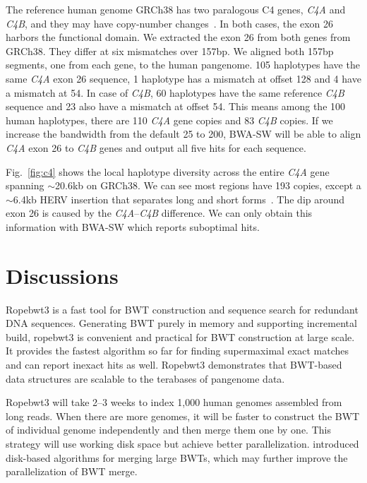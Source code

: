\documentclass[webpdf,contemporary,large,namedate]{oup-authoring-template}%
\begin{document}
The reference human genome GRCh38 has two paralogous C4 genes, \emph{C4A} and \emph{C4B}, and they may have copy-number changes~\citep{Sekar:2016aa}.
In both cases, the exon 26 harbors the functional domain.
We extracted the exon 26 from both genes from GRCh38.
They differ at six mismatches over 157bp.
We aligned both 157bp segments, one from each gene, to the human pangenome.
105 haplotypes have the same \emph{C4A} exon 26 sequence, 1 haplotype has a mismatch at offset 128 and 4 have a mismatch at 54.
In case of \emph{C4B}, 60 haplotypes have the same reference \emph{C4B} sequence and 23 also have a mismatch at offset 54.
This means among the 100 human haplotypes, there are 110 \emph{C4A} gene copies and 83 \emph{C4B} copies.
If we increase the bandwidth from the default 25 to 200, BWA-SW will be able to align \emph{C4A} exon 26 to \emph{C4B} genes
and output all five hits for each sequence.

Fig.~\ref{fig:c4} shows the local haplotype diversity across the entire \emph{C4A} gene spanning $\sim$20.6kb on GRCh38.
We can see most regions have 193 copies, except a $\sim$6.4kb HERV insertion that separates long and short forms~\citep{Sekar:2016aa}.
The dip around exon 26 is caused by the \emph{C4A}--\emph{C4B} difference.
We can only obtain this information with BWA-SW which reports suboptimal hits.

\section{Discussions}

Ropebwt3 is a fast tool for BWT construction and sequence search for redundant DNA sequences.
Generating BWT purely in memory and supporting incremental build, ropebwt3 is convenient and practical for BWT construction at large scale.
It provides the fastest algorithm so far for finding supermaximal exact matches and can report inexact hits as well.
Ropebwt3 demonstrates that BWT-based data structures are scalable to the terabases of pangenome data.

Ropebwt3 will take 2--3 weeks to index 1,000 human genomes assembled from long reads.
When there are more genomes, it will be faster to construct the BWT of individual genome independently
and then merge them one by one.
This strategy will use working disk space but achieve better parallelization.
\citet{DBLP:conf/dcc/Siren16} introduced disk-based algorithms for merging large BWTs, which may further improve the parallelization of BWT merge.
\end{document}
